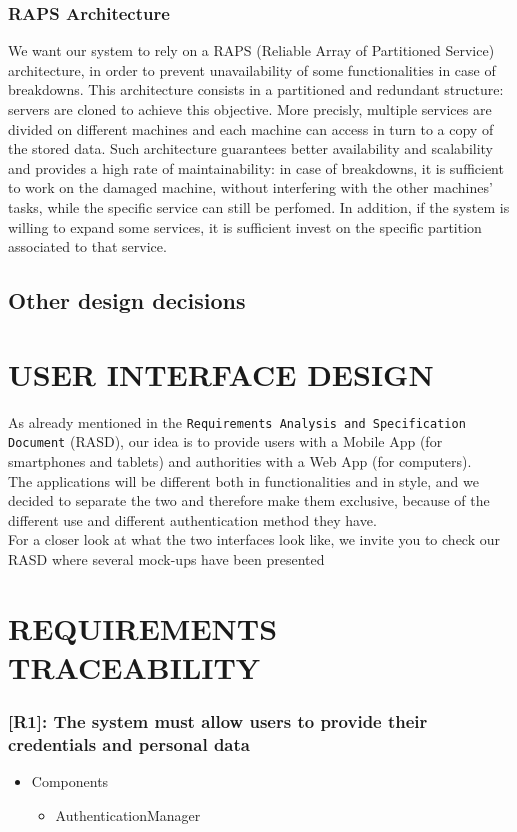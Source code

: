 \documentclass[12pt,a4paper]{article}
\begin{document}
\subsubsection{RAPS Architecture}
We want our system to rely on a RAPS (Reliable Array of Partitioned Service) architecture, in order to prevent unavailability of some functionalities in case of breakdowns. This architecture consists in a partitioned and redundant structure: servers are cloned to achieve this objective. More precisly, multiple services are divided on different machines and each machine can access in turn to a copy of the stored data. Such architecture guarantees better availability and scalability and provides a high rate of maintainability: in case of breakdowns, it is sufficient to work on the damaged machine, without interfering with the other machines' tasks, while the specific service can still be perfomed. In addition, if the system is willing to expand some services, it is sufficient invest
on the specific partition associated to that service.
\subsection{Other design decisions}

\section{USER INTERFACE DESIGN}
As already mentioned in the \texttt{Requirements Analysis and Specification Document} (RASD), our idea is to provide users with a Mobile App (for smartphones and tablets) and authorities with a Web App (for computers).\\ The applications will be different both in functionalities and in style, and we decided to separate the two and therefore make them exclusive, because of the different use and different authentication method they have.\\ For a closer look at what the two interfaces look like, we invite you to check our RASD where several mock-ups have been presented
\section{REQUIREMENTS TRACEABILITY}
\subsubsection*{[R1]: The system must allow users to provide their credentials and personal data}
\begin{itemize}
\item Components
\begin{itemize}
\item AuthenticationManager
\end{itemize}
\end{itemize}
\end{document}
